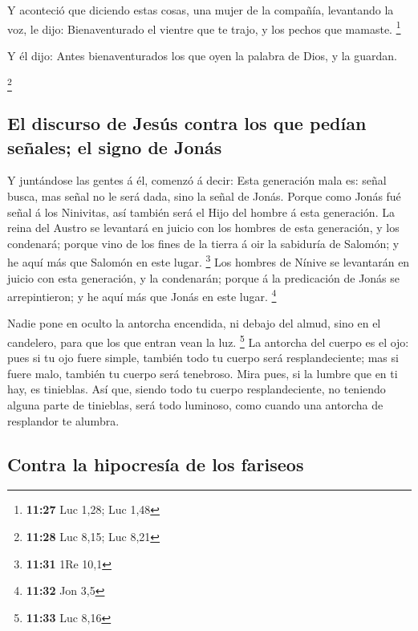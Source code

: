 Y aconteció que diciendo estas cosas, una mujer de la
compañía, levantando la voz, le dijo: Bienaventurado el vientre que te
trajo, y los pechos que mamaste. \footnote{\textbf{11:27} Luc 1,28; Luc
  1,48}

 Y él dijo: Antes bienaventurados los que oyen la palabra
de Dios, y la guardan.

\footnote{\textbf{11:28} Luc 8,15; Luc 8,21}

\hypertarget{el-discurso-de-jesuxfas-contra-los-que-peduxedan-seuxf1ales-el-signo-de-jonuxe1s}{%
\subsection{El discurso de Jesús contra los que pedían señales; el signo
de
Jonás}\label{el-discurso-de-jesuxfas-contra-los-que-peduxedan-seuxf1ales-el-signo-de-jonuxe1s}}

 Y juntándose las gentes á él, comenzó á decir: Esta
generación mala es: señal busca, mas señal no le será dada, sino la
señal de Jonás.  Porque como Jonás fué señal á los
Ninivitas, así también será el Hijo del hombre á esta generación.
 La reina del Austro se levantará en juicio con los hombres
de esta generación, y los condenará; porque vino de los fines de la
tierra á oir la sabiduría de Salomón; y he aquí más que Salomón en este
lugar. \footnote{\textbf{11:31} 1Re 10,1}  Los hombres de
Nínive se levantarán en juicio con esta generación, y la condenarán;
porque á la predicación de Jonás se arrepintieron; y he aquí más que
Jonás en este lugar. \footnote{\textbf{11:32} Jon 3,5}

 Nadie pone en oculto la antorcha encendida, ni debajo del
almud, sino en el candelero, para que los que entran vean la luz.
\footnote{\textbf{11:33} Luc 8,16}  La antorcha del cuerpo
es el ojo: pues si tu ojo fuere simple, también todo tu cuerpo será
resplandeciente; mas si fuere malo, también tu cuerpo será tenebroso.
 Mira pues, si la lumbre que en ti hay, es tinieblas.
 Así que, siendo todo tu cuerpo resplandeciente, no
teniendo alguna parte de tinieblas, será todo luminoso, como cuando una
antorcha de resplandor te alumbra.

\hypertarget{contra-la-hipocresuxeda-de-los-fariseos}{%
\subsection{Contra la hipocresía de los
fariseos}\label{contra-la-hipocresuxeda-de-los-fariseos}}

